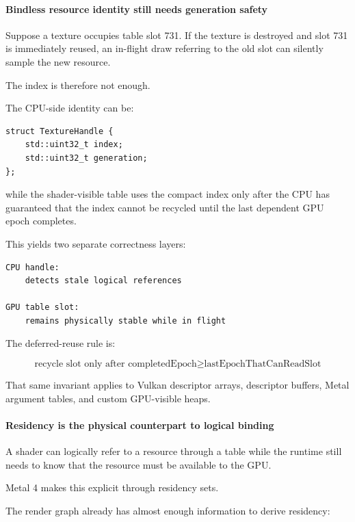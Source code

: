 \paragraph{Bindless resource identity still needs generation safety}\label{bindless-resource-identity-still-needs-generation-safety}

Suppose a texture occupies table slot 731. If the texture is destroyed and slot 731 is immediately reused, an in-flight draw referring to the old slot can silently sample the new resource.

The index is therefore not enough.

The CPU-side identity can be:

\begin{verbatim}
struct TextureHandle {
    std::uint32_t index;
    std::uint32_t generation;
};
\end{verbatim}

while the shader-visible table uses the compact index only after the CPU has guaranteed that the index cannot be recycled until the last dependent GPU epoch completes.

This yields two separate correctness layers:

\begin{verbatim}
CPU handle:
    detects stale logical references

GPU table slot:
    remains physically stable while in flight
\end{verbatim}

The deferred-reuse rule is:

\[
\boxed{
\text{recycle slot only after completedEpoch}
\ge
\text{lastEpochThatCanReadSlot}
}
\]

That same invariant applies to Vulkan descriptor arrays, descriptor buffers, Metal argument tables, and custom GPU-visible heaps.

\paragraph{Residency is the physical counterpart to logical binding}\label{residency-is-the-physical-counterpart-to-logical-binding}

A shader can logically refer to a resource through a table while the runtime still needs to know that the resource must be available to the GPU.

Metal 4 makes this explicit through residency sets.

The render graph already has almost enough information to derive residency:

